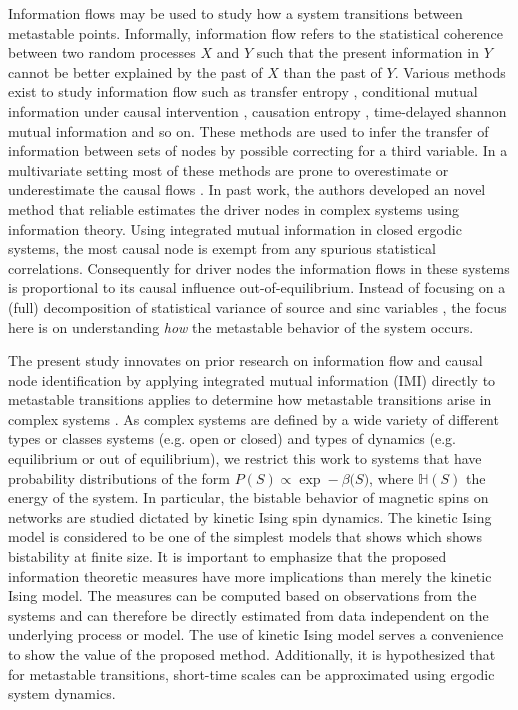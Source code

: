 \documentclass[a4paper, 11pt, twocolumn]{article}
\begin{document}
Information  flows  may  be  used  to  study  how  a  system
transitions    between   metastable    points.   Informally,
information flow refers to the statistical coherence between
two  random processes  $X$  and $Y$  such  that the  present
information in $Y$ cannot be better explained by the past of
$X$ than  the past  of $Y$. Various  methods exist  to study
information  flow such  as transfer  entropy \cite{Schreiber},
conditional  mutual  information under  causal  intervention
\cite{Ay2008}, causation  entropy \cite{Runge2019}, time-delayed
shannon  mutual information  \cite{Li2018}  and  so on.  These
methods  are  used  to  infer the  transfer  of  information
between sets  of nodes  by possible  correcting for  a third
variable. In  a multivariate  setting most of  these methods
are prone to overestimate  or underestimate the causal flows
\cite{James2016}. In past work, the authors developed an novel
method that  reliable estimates the driver  nodes in complex
systems  using information  theory. Using  integrated mutual
information in closed ergodic  systems, the most causal node
is  exempt  from   any  spurious  statistical  correlations.
Consequently for driver nodes the information flows in these
systems   is   proportional    to   its   causal   influence
out-of-equilibrium.   Instead  of   focusing  on   a  (full)
decomposition  of statistical  variance of  source and  sinc
variables  \cite{Janzing2013,Schamberg2020,Williams2010a}, the
focus here is on understanding \emph{how} the metastable behavior
of the system occurs.

The present study innovates on prior research on information
flow and  causal node identification by  applying integrated
mutual information (IMI)  directly to metastable transitions
applies  to determine  how metastable  transitions arise  in
complex  systems  \cite{Quax2013,vanElteren2021}.  As  complex
systems are defined by a  wide variety of different types or
classes systems (e.g. open or  closed) and types of dynamics
(e.g. equilibrium  or out of equilibrium),  we restrict this
work to  systems that have probability  distributions of the
form $P(S) \propto \exp  -\beta \mathbb(S)$, where $\mathbb{H}(S)$ the
energy of  the system. In particular,  the bistable behavior
of  magnetic  spins  on  networks are  studied  dictated  by
kinetic  Ising spin  dynamics.  The kinetic  Ising model  is
considered to be one of the simplest models that shows which
shows  bistability  at  finite  size.  It  is  important  to
emphasize that  the proposed information  theoretic measures
have more implications than  merely the kinetic Ising model.
The measures can be computed  based on observations from the
systems and  can therefore  be directly estimated  from data
independent on the  underlying process or model.  The use of
kinetic Ising model  serves a convenience to  show the value
of  the proposed  method. Additionally,  it is  hypothesized
that for  metastable transitions,  short-time scales  can be
approximated using ergodic system dynamics.
\end{document}

